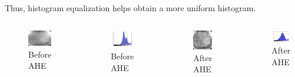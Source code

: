 \documentclass[12pt]{beamer}
\begin{document}
\subsection{}
\begin{frame}[c]
\frametitle{}
Thus, histogram equalization helps obtain a more uniform histogram.\\
\begin{columns}[t]
 \begin{figure}
 \centering
 \vskip-15pt
 \includegraphics[width=4cm]{./ah1.jpg}
 \vskip-10pt
 \caption{Before AHE}
\end{figure}
 \begin{figure}
 \centering
 \vskip-24pt
 \includegraphics[width=4cm]{./ah3.jpg}
 \vskip-10pt
 \caption{Before AHE}
\end{figure}
 \begin{figure}
 \centering
 \vskip-15pt
 \includegraphics[width=2.8cm]{./ah2.jpg}
 \vskip-10pt
 \caption{After AHE}
\end{figure}
 \begin{figure}
 \centering
 \vskip-24pt
 \includegraphics[width=4.6cm]{./ah4.jpg}
 \vskip-10pt
 \caption{After AHE}
\end{figure}
\end{columns}
\end{frame}
\end{document}
